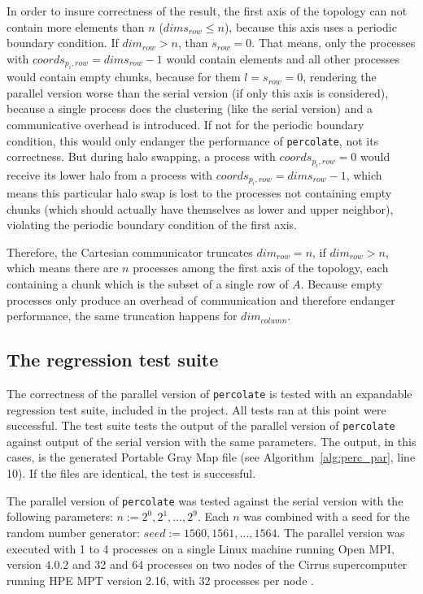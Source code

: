 \documentclass[twoside,11pt]{article}
\def\perc{\texttt{perco\-late}}
\begin{document}
In order to insure correctness of the result, the first
axis of the topology can not contain more elements than $n$
($dims_{row} \leq n$), because this axis uses a periodic
boundary condition.
If $dim_{row} > n$, than $s_{row} = 0$. That means, only
the processes with $coords_{p_i, row} = dims_{row} - 1$
would contain elements and all other processes would
contain empty chunks, because for them $l = s_{row} = 0$,
rendering the parallel version worse than the serial
version (if only this axis is considered), because a single process does the
clustering (like the serial version) and a communicative
overhead is introduced.
If not for the periodic boundary condition, this would only
endanger the performance of \perc{}, not its correctness.
But during halo swapping, a process with $coords_{p_i, row}
= 0$ would receive its lower halo from a process with
$coords_{p_i, row} = dims_{row} - 1$, which means this
particular halo swap is lost to the processes not
containing empty chunks (which should actually have
themselves as lower and upper neighbor), violating the
periodic boundary condition of the first axis.

Therefore, the Cartesian communicator truncates
$dim_{row} = n$, if $dim_{row} > n$, which means there are
$n$ processes among the first axis of the topology, each
containing a chunk which is the subset of a single row of
$A$.
Because empty processes only produce an overhead of
communication and therefore endanger performance, the same
truncation happens for $dim_{column}$.



\subsection{The regression test suite}

The correctness of the parallel version of \perc{} is
tested with an expandable regression test suite, included
in the project.
All tests ran at this point were successful.
The test suite tests the output of the parallel version of
\perc{} against output of the serial version with the same
parameters.
The output, in this cases, is the generated Portable Gray
Map file (see Algorithm~\ref{alg:perc_par}, line 10).
If the files are identical, the test is successful.

The parallel version of \perc{} was tested against the
serial version with the following parameters:
$n := 2^0, 2^1,\dots,2^9$.
Each $n$ was combined with a seed for the random number
generator: $seed := 1560, 1561,\dots, 1564$.
The parallel version was executed with 1 to 4 processes on
a single Linux machine running Open MPI, version $4.0.2$
and 32 and 64 processes on two nodes of the Cirrus
supercomputer running HPE MPT version 2.16, with 32
processes per node \citep[see][]{openmpi, cirrus}.
\end{document}
